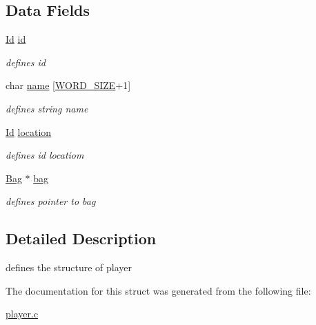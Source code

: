 \subsection*{Data Fields}
\begin{DoxyCompactItemize}
\item 
\mbox{\label{struct__Player_a60d635cd063816a9c1bd873f4868bb90}} 
\hyperlink{types_8h_a845e604fb28f7e3d97549da3448149d3}{Id} \hyperlink{struct__Player_a60d635cd063816a9c1bd873f4868bb90}{id}
\begin{DoxyCompactList}\small\item\em defines id \end{DoxyCompactList}\item 
\mbox{\label{struct__Player_ac89715f913cc607b75eb7236765c41f5}} 
char \hyperlink{struct__Player_ac89715f913cc607b75eb7236765c41f5}{name} \mbox{[}\hyperlink{types_8h_a92ed8507d1cd2331ad09275c5c4c1c89}{W\+O\+R\+D\+\_\+\+S\+I\+ZE}+1\mbox{]}
\begin{DoxyCompactList}\small\item\em defines string name \end{DoxyCompactList}\item 
\mbox{\label{struct__Player_adbb6195d15b88f3f658e74274eff52d8}} 
\hyperlink{types_8h_a845e604fb28f7e3d97549da3448149d3}{Id} \hyperlink{struct__Player_adbb6195d15b88f3f658e74274eff52d8}{location}
\begin{DoxyCompactList}\small\item\em defines id locatiom \end{DoxyCompactList}\item 
\mbox{\label{struct__Player_a723e17ec37bbe34a7d61c1a8f5d5d0bd}} 
\hyperlink{inventory_8h_a96eaad8b37d9b6e19ddc373ec38c751e}{Bag} $\ast$ \hyperlink{struct__Player_a723e17ec37bbe34a7d61c1a8f5d5d0bd}{bag}
\begin{DoxyCompactList}\small\item\em defines pointer to bag \end{DoxyCompactList}\end{DoxyCompactItemize}


\subsection{Detailed Description}
defines the structure of player 

The documentation for this struct was generated from the following file\+:\begin{DoxyCompactItemize}
\item 
\hyperlink{player_8c}{player.\+c}\end{DoxyCompactItemize}

